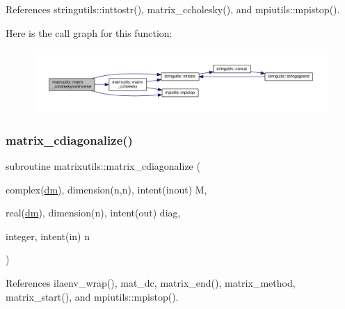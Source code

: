 References stringutils\+::inttostr(), matrix\+\_\+ccholesky(), and mpiutils\+::mpistop().

Here is the call graph for this function\+:
\nopagebreak
\begin{figure}[H]
\begin{center}
\leavevmode
\includegraphics[width=350pt]{namespacematrixutils_a3d8668e32abacfbeeeaaca90c120a129_cgraph}
\end{center}
\end{figure}
\mbox{\label{namespacematrixutils_a29011a04a13e1b49c36d226591b3e5a4}} 
\subsubsection{\texorpdfstring{matrix\+\_\+cdiagonalize()}{matrix\_cdiagonalize()}}
{\footnotesize\ttfamily subroutine matrixutils\+::matrix\+\_\+cdiagonalize (\begin{DoxyParamCaption}\item[{complex(\mbox{\hyperlink{namespacematrixutils_a7bdc564986ea4d90f51201c75606ef3d}{dm}}), dimension(n,n), intent(inout)}]{M,  }\item[{real(\mbox{\hyperlink{namespacematrixutils_a7bdc564986ea4d90f51201c75606ef3d}{dm}}), dimension(n), intent(out)}]{diag,  }\item[{integer, intent(in)}]{n }\end{DoxyParamCaption})}



References ilaenv\+\_\+wrap(), mat\+\_\+dc, matrix\+\_\+end(), matrix\+\_\+method, matrix\+\_\+start(), and mpiutils\+::mpistop().

